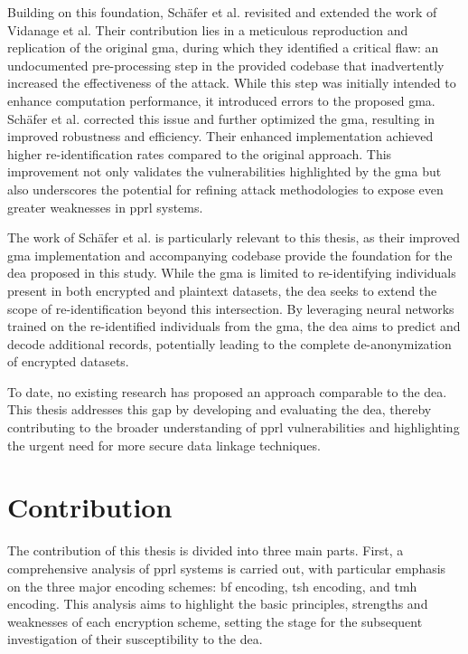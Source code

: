 Building on this foundation, Schäfer et al. \cite{schaefer2024} revisited and extended the work of Vidanage et al. 
Their contribution lies in a meticulous reproduction and replication of the original \ac{gma}, during which they identified a critical flaw: an undocumented pre-processing step in the provided codebase that inadvertently increased the effectiveness of the attack. 
While this step was initially intended to enhance computation performance, it introduced errors to the proposed \ac{gma}. 
Schäfer et al. corrected this issue and further optimized the \ac{gma}, resulting in improved robustness and efficiency. 
Their enhanced implementation achieved higher re-identification rates compared to the original approach. 
This improvement not only validates the vulnerabilities highlighted by the \ac{gma} but also underscores the potential for refining attack methodologies to expose even greater weaknesses in \ac{pprl} systems.

The work of Schäfer et al. is particularly relevant to this thesis, as their improved \ac{gma} implementation and accompanying codebase provide the foundation for the \ac{dea} proposed in this study. 
While the \ac{gma} is limited to re-identifying individuals present in both encrypted and plaintext datasets, the \ac{dea} seeks to extend the scope of re-identification beyond this intersection. 
By leveraging neural networks trained on the re-identified individuals from the \ac{gma}, the \ac{dea} aims to predict and decode additional records, potentially leading to the complete de-anonymization of encrypted datasets.

To date, no existing research has proposed an approach comparable to the \ac{dea}. 
This thesis addresses this gap by developing and evaluating the \ac{dea}, thereby contributing to the broader understanding of \ac{pprl} vulnerabilities and highlighting the urgent need for more secure data linkage techniques.

\section{Contribution}  \label{sec:contribution}

The contribution of this thesis is divided into three main parts. 
First, a comprehensive analysis of \ac{pprl} systems is carried out, with particular emphasis on the three major encoding schemes: \ac{bf} encoding, \ac{tsh} encoding, and \ac{tmh} encoding. 
This analysis aims to highlight the basic principles, strengths and weaknesses of each encryption scheme, setting the stage for the subsequent investigation of their susceptibility to the \ac{dea}.


